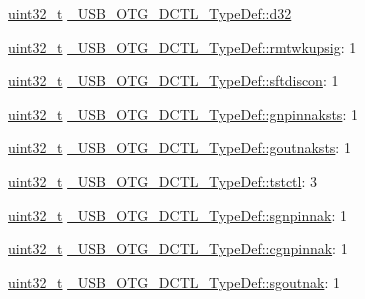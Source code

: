 \begin{DoxyCompactItemize}
\begin{tabbing}
\end{tabbing}\item 
\hyperlink{stdint_8h_a435d1572bf3f880d55459d9805097f62}{uint32\-\_\-t} \hyperlink{group___u_s_b___o_t_g___d_r_i_v_e_r_gad10935a4e428299cce281622bdfe56fe}{\-\_\-\-U\-S\-B\-\_\-\-O\-T\-G\-\_\-\-D\-C\-T\-L\-\_\-\-Type\-Def\-::d32}
\item 
\hyperlink{stdint_8h_a435d1572bf3f880d55459d9805097f62}{uint32\-\_\-t} \hyperlink{group___u_s_b___o_t_g___d_r_i_v_e_r_gabb9a7d82a51be5c6bde5ec9e107ae756}{\-\_\-\-U\-S\-B\-\_\-\-O\-T\-G\-\_\-\-D\-C\-T\-L\-\_\-\-Type\-Def\-::rmtwkupsig}\-: 1
\item 
\hyperlink{stdint_8h_a435d1572bf3f880d55459d9805097f62}{uint32\-\_\-t} \hyperlink{group___u_s_b___o_t_g___d_r_i_v_e_r_gaf94e6c012ba368a29ac9e69ea7f44f73}{\-\_\-\-U\-S\-B\-\_\-\-O\-T\-G\-\_\-\-D\-C\-T\-L\-\_\-\-Type\-Def\-::sftdiscon}\-: 1
\item 
\hyperlink{stdint_8h_a435d1572bf3f880d55459d9805097f62}{uint32\-\_\-t} \hyperlink{group___u_s_b___o_t_g___d_r_i_v_e_r_gad7acaf4c455dbc42572cf9cbf2ffc23e}{\-\_\-\-U\-S\-B\-\_\-\-O\-T\-G\-\_\-\-D\-C\-T\-L\-\_\-\-Type\-Def\-::gnpinnaksts}\-: 1
\item 
\hyperlink{stdint_8h_a435d1572bf3f880d55459d9805097f62}{uint32\-\_\-t} \hyperlink{group___u_s_b___o_t_g___d_r_i_v_e_r_ga3b7b7552607f4d947024e7334f9212c1}{\-\_\-\-U\-S\-B\-\_\-\-O\-T\-G\-\_\-\-D\-C\-T\-L\-\_\-\-Type\-Def\-::goutnaksts}\-: 1
\item 
\hyperlink{stdint_8h_a435d1572bf3f880d55459d9805097f62}{uint32\-\_\-t} \hyperlink{group___u_s_b___o_t_g___d_r_i_v_e_r_gaa3c8160005524429f22fe85d778f5dcc}{\-\_\-\-U\-S\-B\-\_\-\-O\-T\-G\-\_\-\-D\-C\-T\-L\-\_\-\-Type\-Def\-::tstctl}\-: 3
\item 
\hyperlink{stdint_8h_a435d1572bf3f880d55459d9805097f62}{uint32\-\_\-t} \hyperlink{group___u_s_b___o_t_g___d_r_i_v_e_r_ga444b8daf71ae36bb5d68b2d837f436f0}{\-\_\-\-U\-S\-B\-\_\-\-O\-T\-G\-\_\-\-D\-C\-T\-L\-\_\-\-Type\-Def\-::sgnpinnak}\-: 1
\item 
\hyperlink{stdint_8h_a435d1572bf3f880d55459d9805097f62}{uint32\-\_\-t} \hyperlink{group___u_s_b___o_t_g___d_r_i_v_e_r_ga41d7827ced20eb92bcb20d8a1afc1fe9}{\-\_\-\-U\-S\-B\-\_\-\-O\-T\-G\-\_\-\-D\-C\-T\-L\-\_\-\-Type\-Def\-::cgnpinnak}\-: 1
\item 
\hyperlink{stdint_8h_a435d1572bf3f880d55459d9805097f62}{uint32\-\_\-t} \hyperlink{group___u_s_b___o_t_g___d_r_i_v_e_r_ga1f7b8be5eec6ec007263d62310d0a463}{\-\_\-\-U\-S\-B\-\_\-\-O\-T\-G\-\_\-\-D\-C\-T\-L\-\_\-\-Type\-Def\-::sgoutnak}\-: 1

\end{DoxyCompactItemize}
